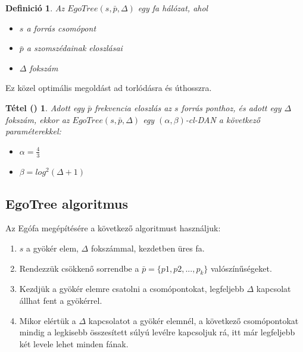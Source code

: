 \documentclass[12pt]{report}
\newtheorem{mydef}{Definició}
\newtheorem{mytetel}{Tétel (\cite{avin_demand-aware_nodate})}
\begin{document}
\begin{mydef}
	Az \(EgoTree(s, \bar{p}, \Delta) \) egy fa hálózat, ahol
	\begin{itemize}
		\item \(s\) a forrás csomópont
		\item \(\bar{p}\) a szomszédainak eloszlásai
		\item \(\Delta\) fokszám
	\end{itemize}
\end{mydef}

Ez közel optimális megoldást ad torlódásra és úthosszra.


\begin{mytetel}
	Adott egy  \(\bar{p}\) frekvencia eloszlás az \(s\) forrás ponthoz, és adott egy \(\Delta\) fokszám, ekkor az \(EgoTree(s, \bar{p}, \Delta)\) egy \((\alpha, \beta)\)-cl-DAN a következő paraméterekkel:
	\begin{itemize}
		\item \(\alpha = \frac{4}{3}\)
		\item \(\beta = log^2(\Delta + 1)\)
	\end{itemize}
\end{mytetel}

\subsection{EgoTree algoritmus}

Az Egófa megépítésére a következő algoritmust használjuk:

\begin{enumerate}
	\item \(s\) a gyökér elem, \(\Delta\) fokszámmal, kezdetben üres fa.
	\item Rendezzük csökkenő sorrendbe a \(\bar{p} = \{p1, p2, ..., p_k\}\) valószínűségeket.
	\item Kezdjük a gyökér elemre csatolni a csomópontokat, legfeljebb \(\Delta\) kapcsolat állhat fent a gyökérrel.
	\item Mikor elértük a \(\Delta\) kapcsolatot a gyökér elemnél, a következő csomópontokat mindig a legkisebb összesített súlyú levélre kapcsoljuk rá, itt már legfeljebb két levele lehet minden fának.
\end{enumerate}
\end{document}
